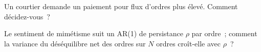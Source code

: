 \begin{interviewq}\label{iq:hf:retail-wholesaling:5}
Un courtier demande un paiement pour flux d'ordres plus élevé. Comment décidez-vous~?
\end{interviewq}

\begin{interviewq}\label{iq:hf:retail-wholesaling:6}
Le sentiment de mimétisme suit un AR(1) de persistance $\rho$ par ordre~; comment la variance du déséquilibre net des ordres sur $N$ ordres croît-elle
avec $\rho$~?
\end{interviewq}
